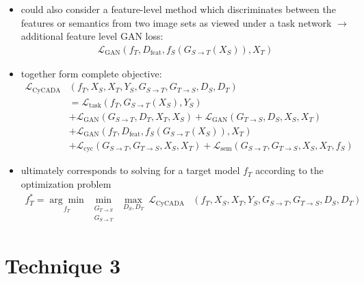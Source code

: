 \begin{itemize}
	\item could also consider a feature-level method which discriminates between the features or semantics from two image sets as viewed under a task network $\rightarrow$ additional feature level GAN loss:
	\begin{align}
		\mathcal{L}_{\text{GAN}}(f_T, D_{\text{feat}}, f_S(G_{S\rightarrow T}(X_S)), X_T)
	\end{align}
	\item together form complete objective:
	\begin{align}
		\mathcal{L}_{\text{CyCADA}}&(f_T, X_S, X_T, Y_S, G_{S\rightarrow T}, G_{T\rightarrow S}, D_S, D_T)\\
		&= \mathcal{L}_{\text{task}}(f_T, G_{S\rightarrow T}(X_S), Y_S)\\
		&+ \mathcal{L}_{\text{GAN}}(G_{S\rightarrow T}, D_T, X_T, X_S) + \mathcal{L}_{\text{GAN}}(G_{T\rightarrow S}, D_S, X_S, X_T)\\
		&+ \mathcal{L}_{\text{GAN}}(f_T, D_{\text{feat}}, f_S(G_{S\rightarrow T}(X_S)), X_T)\\
		&+ \mathcal{L}_{\text{cyc}}(G_{S\rightarrow T}, G_{T\rightarrow S}, X_S, X_T) + \mathcal{L}_{\text{sem}}(G_{S\rightarrow T}, G_{T\rightarrow S}, X_S, X_T, f_S)
	\end{align}
	\item ultimately corresponds to solving for a target model $f_T$ according to the optimization problem
	\begin{align}
		f^*_T = \underset{f_T}{\arg\min} ~ \underset{\substack{G_{T\rightarrow S} \\ G_{S\rightarrow T}}}{\min} ~ \underset{D_S, D_T}{\max} ~ \mathcal{L}_{\text{CyCADA}}&(f_T, X_S, X_T, Y_S, G_{S\rightarrow T}, G_{T\rightarrow S}, D_S, D_T)
	\end{align}
\end{itemize}

\newpage

\section{Technique 3}
